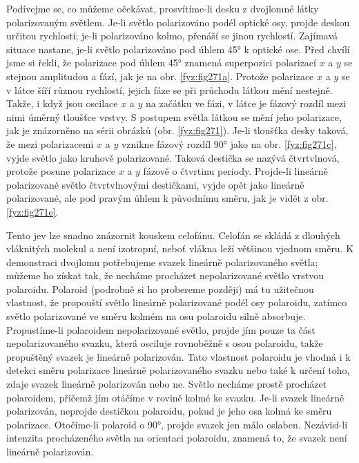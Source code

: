     Podívejme se, co můžeme očekávat, prosvítíme-li desku z dvojlomné látky polarizovaným světlem.
    Je-li světlo polarizováno podél optické osy, projde deskou určitou rychlostí; je-li polarizováno
    kolmo, přenáší se jinou rychlostí. Zajímavá situace nastane, je-li světlo polarizováno pod úhlem
    \ang{45} k optické ose. Před chvílí jsme si řekli, že polarizace pod úhlem \ang{45} znamená
    superpozici polarizací \(x\) a \(y\) se stejnou amplitudou a fází, jak je na obr.
    \ref{fyz:fig271a}. Protože polarizace \(x\) a \(y\) se v látce šíří různou rychlostí, jejich
    fáze se při průchodu látkou mění nestejně. Takže, i když jsou oscilace \(x\) a \(y\) na začátku
    ve fázi, v látce je fázový rozdíl mezi nimi úměrný tloušťce vrstvy. S postupem světla látkou se
    mění jeho polarizace, jak je znázorněno na sérii obrázků (obr. \ref{fyz:fig271}). Je-li tloušťka
    desky taková, že mezi polarizacemi \(x\) a \(y\) vznikne fázový rozdíl \ang{90} jako na obr.
    \ref{fyz:fig271c}, vyjde světlo jako kruhově polarizované. Taková destička se nazývá
    čtvrtvlnová, protože posune polarizace \(x\) a \(y\) fázově o čtvrtinu periody. Projde-li
    lineárně polarizované světlo čtvrtvlnovými destičkami, vyjde opět jako lineárně polarizované,
    ale pod pravým úhlem k původnímu směru, jak je vidět z obr. \ref{fyz:fig271e}.

    Tento jev lze snadno znázornit kouskem celofánu. Celofán se skládá z dlouhých vláknitých molekul
    a není izotropní, neboť vlákna leží většinou vjednom směru. K demonstraci dvojlomu potřebujeme
    svazek lineárně polarizovaného světla; můžeme ho získat tak, že necháme procházet nepolarizované
    světlo vrstvou polaroidu. Polaroid (podrobně si ho probereme později) má tu užitečnou vlastnost,
    že propouští světlo lineárně polarizované podél osy polaroidu, zatímco světlo polarizované ve
    směru kolmém na osu polaroidu silně absorbuje. Propustíme-li polaroidem nepolarizované světlo,
    projde jím pouze ta část nepolarizovaného svazku, která osciluje rovnoběžně s osou polaroidu,
    takže propuštěný svazek je lineárně polarizován. Tato vlastnost polaroidu je vhodná i k detekci
    směru polarizace lineárně polarizovaného svazku nebo také k určení toho, zdaje svazek lineárně
    polarizován nebo ne. Světlo necháme prostě procházet polaroidem, přičemž jím otáčíme v rovině
    kolmé ke svazku. Je-li svazek lineárně polarizován, neprojde destičkou polaroidu, pokud je jeho
    osa kolmá ke směru polarizace. Otočíme-li polaroid o \ang{90}, projde svazek jen málo oslaben.
    Nezávisí-li intenzita procházeného světla na orientaci polaroidu, znamená to, že svazek není
    lineárně polarizován.

